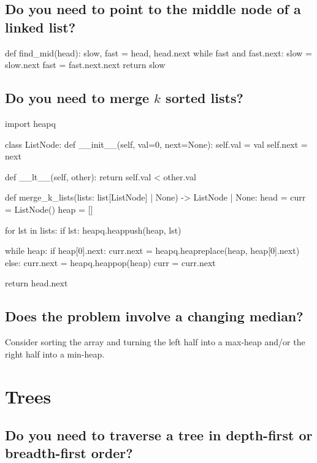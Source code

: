 \documentclass[12pt, titlepage]{article}
\begin{document}
\subsection{Do you need to point to the middle node of a linked list?}

\begin{python}
def find_mid(head):
    slow, fast = head, head.next
    while fast and fast.next:
        slow = slow.next
        fast = fast.next.next
    return slow
\end{python}

\subsection{Do you need to merge $k$ sorted lists?}

\begin{python}
import heapq

class ListNode:
    def __init__(self, val=0, next=None):
        self.val = val
        self.next = next

    def __lt__(self, other):
        return self.val < other.val

def merge_k_lists(lists: list[ListNode] | None) -> ListNode | None:
    head = curr = ListNode()
    heap = []

    for lst in lists:
        if lst:
            heapq.heappush(heap, lst)

    while heap:
        if heap[0].next:
            curr.next = heapq.heapreplace(heap, heap[0].next)
        else:
            curr.next = heapq.heappop(heap)
        curr = curr.next

    return head.next
\end{python}

\subsection{Does the problem involve a changing median?}

Consider sorting the array and turning the left half into a max-heap and/or the right half into a min-heap.

\section{Trees}

\subsection{Do you need to traverse a tree in depth-first or breadth-first order?}
\end{document}
